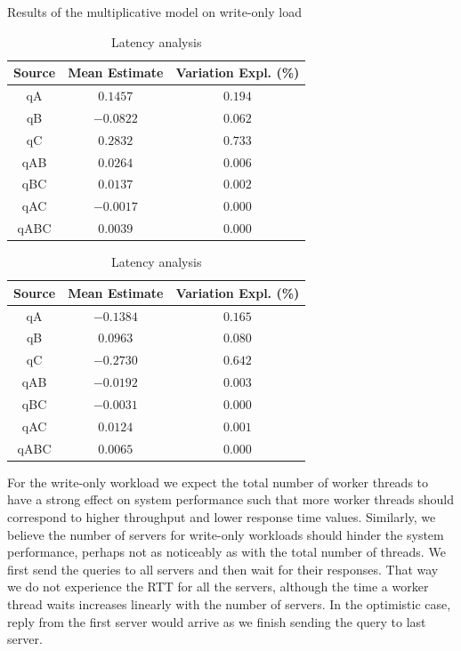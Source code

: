 \documentclass[11pt,a4paper]{article}
\begin{document}
\begin{table}[h]
\centering
{Results of the multiplicative model on write-only load}
\begin{minipage}{.5\textwidth}
\centering
	\begin{tabular}{|c|c|c|}
	\hline 
	{\small Source} & {\small Mean Estimate} & {\small Variation Expl. (\%)} \\ 
	\hline 
	qA & $0.1457$ & $0.194$ \\ 
	\hline 
	qB & $-0.0822$ & $0.062$ \\ 
	\hline 
	qC & $0.2832$ & $0.733$ \\ 
	\hline 
	qAB & $0.0264$ & $0.006$ \\ 
	\hline 
	qBC & $0.0137$ & $0.002$ \\ 
	\hline 
	qAC & $-0.0017$ & $0.000$ \\ 
	\hline 
	qABC & $0.0039$ & $0.000$ \\ 
	\hline 
	\end{tabular} \caption{Throughput analysis} \label{tab:2k-mult-wo-tpt}
\end{minipage}%
\begin{minipage}{.5\textwidth}
\centering
	\begin{tabular}{|c|c|c|}
	\hline 
	{\small Source} & {\small Mean Estimate} & {\small Variation Expl. (\%)} \\ 
	\hline 
	qA & $-0.1384$ & $0.165$ \\ 
	\hline 
	qB & $0.0963$ & $0.080$ \\ 
	\hline 
	qC & $-0.2730$ & $0.642$ \\ 
	\hline 
	qAB & $-0.0192$ & $0.003$ \\ 
	\hline 
	qBC & $-0.0031$ & $0.000$ \\ 
	\hline 
	qAC & $0.0124$ & $0.001$ \\ 
	\hline 
	qABC & $0.0065$ & $0.000$ \\ 
	\hline 
	\end{tabular} \caption{Latency analysis} \label{tab:2k-mult-wo-lat}
\end{minipage}
\end{table}\label{tab:2k-mult-wo}
\par For the write-only workload we expect the total number of worker threads to have a strong effect on system performance such that more worker threads should correspond to higher throughput and lower response time values. Similarly, we believe the number of servers for write-only workloads should hinder the system performance, perhaps not as noticeably as with the total number of threads. We first send the queries to all servers and then wait for their responses. That way we do not experience the RTT for all the servers, although the time a worker thread waits increases linearly with the number of servers. In the optimistic case, reply from the first server would arrive as we finish sending the query to last server.
\end{document}
